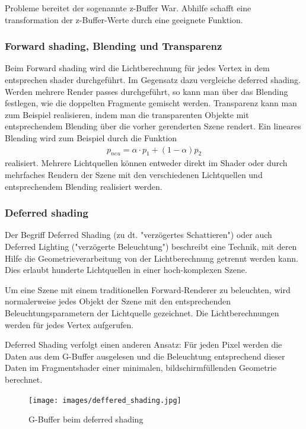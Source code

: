 Probleme bereitet der sogenannte z-Buffer War. Abhilfe schafft eine transformation der z-Buffer-Werte durch eine geeignete Funktion.



\subsubsection{ Forward shading, Blending und Transparenz}
Beim Forward shading wird die Lichtberechnung für jedes Vertex in dem entsprechen shader durchgeführt. Im Gegensatz dazu vergleiche deferred shading.
Werden mehrere Render passes durchgeführt, so kann man über das Blending festlegen, wie die doppelten Fragmente gemischt werden.
Transparenz kann man zum Beispiel realisieren, indem man die transparenten Objekte mit entsprechendem Blending über die vorher gerenderten  Szene rendert.
Ein lineares Blending wird zum Beispiel durch die Funktion 
\begin{align}
p_{neu} = \alpha \cdot p_1 + (1- \alpha)p_2
\end{align}
realisiert. Mehrere Lichtquellen können entweder direkt im Shader oder durch mehrfaches Rendern der Szene mit den verschiedenen Lichtquellen und entsprechendem Blending realisiert werden.
\subsubsection{Deferred shading}
Der Begriff Deferred Shading (zu dt. "verzögertes Schattieren") oder auch Deferred Lighting ("verzögerte Beleuchtung") beschreibt eine Technik, mit deren Hilfe die Geometrieverarbeitung von der Lichtberechnung getrennt werden kann. Dies erlaubt hunderte Lichtquellen in einer hoch-komplexen Szene.


Um eine Szene mit einem traditionellen Forward-Renderer zu beleuchten, wird normalerweise jedes Objekt der Szene mit den entsprechenden Beleuchtungsparametern der Lichtquelle gezeichnet. 
Die Lichtberechnungen werden für jedes Vertex aufgerufen.

Deferred Shading verfolgt einen anderen Ansatz: Für jeden Pixel werden die Daten aus dem G-Buffer ausgelesen und die Beleuchtung entsprechend dieser Daten im Fragmentshader einer minimalen, bildschirmfüllenden Geometrie berechnet. 


\begin{figure}[H]
    \centering
    \texttt{[image: images/deffered\_shading.jpg]}
    \caption{G-Buffer beim deferred shading} %
    \label{fig:defferedshading}
\end{figure} 

